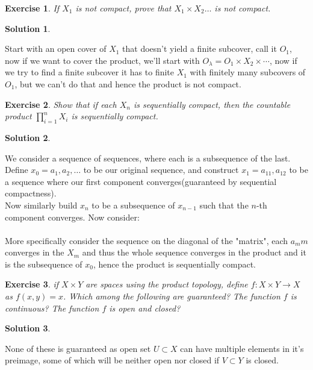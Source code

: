 \documentclass[11pt,a4paper]{article}
\newtheorem{Ex}{Exercise}
\newtheorem{Sol}{Solution}
\begin{document}
\begin{Ex}
	If $X_1$ is not compact, prove that $X_1 \times X_2 \dots$ is not compact.
\end{Ex}
\begin{Sol}\end{Sol}
\noindent Start with an open cover of $X_1$ that doesn't yield a finite subcover, call it $O_1$, now if we want to cover the product, we'll start with $O_\lambda = O_1 \times X_2 \times \cdots$, now if we try to find a finite subcover it has to finite $X_1$ with finitely many subcovers of $O_1$, but we can't do that and hence the product is not compact.

\begin{Ex}
	Show that if each $X_n$ is sequentially compact, then the countable product $\prod_{i=1}^{n}X_i$ is sequentially compact.
\end{Ex}  

\begin{Sol}\end{Sol}
\noindent We consider a sequence of sequences, where each is a subsequence of the last. Define $x_0 = a_1,a_2,\dots$ to be our original sequence, and construct $x_1=a_11,a_12$ to be a sequence where our first component converges(guaranteed by sequential compactness). \\
Now similarly build $x_n$ to be a subsequence of $x_{n-1}$ such that the $n$-th component converges. Now consider: \\ \\



More specifically consider the sequence on the diagonal of the "matrix", each $a_mm$ converges in the $X_m$ and thus the whole sequence converges in the product and it is the subsequence of $x_0$, hence the product is sequentially compact. 

\begin{Ex}
	if $X \times Y$ are spaces using the product topology, define $f: X \times Y \rightarrow X$ as $f(x,y)=x$. Which among the following are guaranteed? The function $f$ is continuous? The function $f$ is open and closed? 
\end{Ex}
\begin{Sol}\end{Sol}
\noindent None of these is guaranteed as open set $U \subset X$ can have multiple elements in it's preimage, some of which will be neither open nor closed if $V \subset Y$ is closed. 
\end{document}
